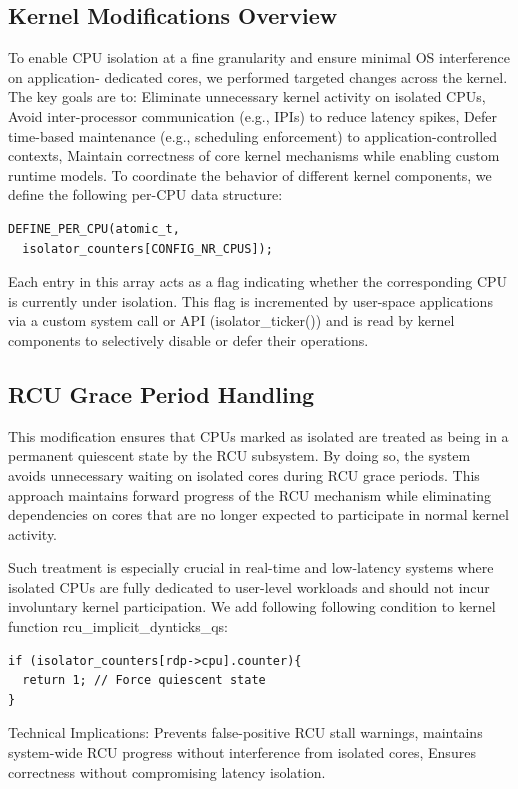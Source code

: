 \documentclass[letterpaper]{article}
\begin{document}
\subsection{Kernel Modifications Overview}
To enable CPU isolation at a fine granularity and ensure minimal OS interference on application-
dedicated cores, we performed targeted changes across the kernel. The key goals are to:
Eliminate unnecessary kernel activity on isolated CPUs,
Avoid inter-processor communication (e.g., IPIs) to reduce latency spikes,
Defer time-based maintenance (e.g., scheduling enforcement) to application-controlled contexts,
Maintain correctness of core kernel mechanisms while enabling custom runtime models.
To coordinate the behavior of different kernel components, we define the following per-CPU data
structure:
\begin{verbatim}
DEFINE_PER_CPU(atomic_t,
  isolator_counters[CONFIG_NR_CPUS]);
\end{verbatim}
Each entry in this array acts as a flag indicating whether the corresponding CPU is currently under
isolation. This flag is incremented by user-space applications via a custom system call or API
(isolator\_ticker()) and is read by kernel components to selectively disable or defer their operations.


\subsection{RCU Grace Period Handling}
This modification ensures that CPUs marked as isolated are treated as being in a permanent
quiescent state by the RCU subsystem. By doing so, the system avoids unnecessary waiting on
isolated cores during RCU grace periods. This approach maintains forward progress of the RCU
mechanism while eliminating dependencies on cores that are no longer expected to participate in
normal kernel activity.

Such treatment is especially crucial in real-time and low-latency systems where isolated CPUs are
fully dedicated to user-level workloads and should not incur involuntary kernel participation.
We add following following condition to kernel function rcu\_implicit\_dynticks\_qs:
\begin{verbatim}
if (isolator_counters[rdp->cpu].counter){
  return 1; // Force quiescent state
}
\end{verbatim}
Technical Implications:
Prevents false-positive RCU stall warnings,
maintains system-wide RCU progress without interference from isolated cores,
Ensures correctness without compromising latency isolation.
\end{document}
